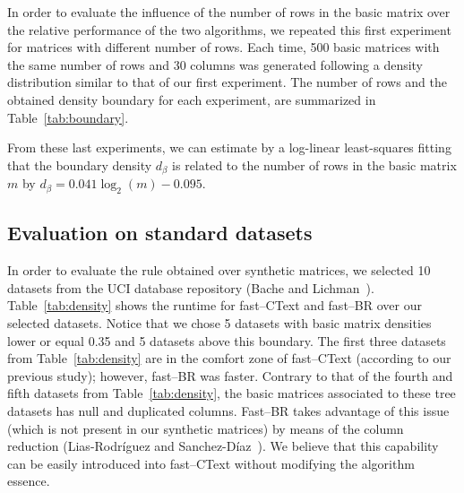 \documentclass[citeauthoryear]{llncs}
\begin{document}
	In order to evaluate the influence of the number of rows in the basic matrix over the relative performance of the two algorithms, we repeated this first experiment for matrices with different number of rows. Each time, 500 basic matrices with the same number of rows and 30 columns was generated following a density distribution similar to that of our first experiment. The number of rows and the obtained density boundary for each experiment, are summarized in Table~\ref{tab:boundary}. 
	
	From these last experiments, we can estimate by a log-linear least-squares fitting that the boundary density $d_\beta$ is related to the number of rows in the basic matrix $m$ by $d_\beta=0.041\log_2(m)-0.095$.
%
\subsection{Evaluation on standard datasets}
	In order to evaluate the rule obtained over synthetic matrices, we selected 10 datasets from the UCI database repository (Bache and Lichman~\cite{Bache13}). Table~\ref{tab:density} shows the runtime for fast--CText and fast--BR over our selected datasets. Notice that we chose 5 datasets with basic matrix densities lower or equal 0.35 and 5 datasets above this boundary. The first three datasets from Table~\ref{tab:density} are in the comfort zone of fast--CText (according to our previous study); however, fast--BR was faster. Contrary to that of the fourth and fifth datasets from Table~\ref{tab:density}, the basic matrices associated to these tree datasets has null and duplicated columns. Fast--BR takes advantage of this issue (which is not present in our synthetic matrices) by means of the column reduction (Lias-Rodr\'iguez and Sanchez-D\'iaz~\cite{Lias2013}). We believe that this capability can be easily introduced into fast--CText without modifying the algorithm essence.
	
\end{document}
